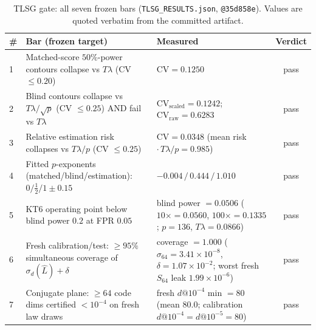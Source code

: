 \documentclass[10pt,onecolumn]{article}
\theoremstyle{plain}
\theoremstyle{definition}
\begin{document}
\begin{table}[t]
\centering
\caption{TLSG gate: all seven frozen bars (\texttt{TLSG\_RESULTS.json},
\texttt{@35d858e}). Values are quoted verbatim from the committed artifact.}
\label{tab:s-tlsg}
\small
\begin{tabular}{@{}p{}p{}p{}c@{}}
\toprule
\# & Bar (frozen target) & Measured & Verdict \\
\midrule
1 & Matched-score $50\%$-power contours collapse vs $T\lambda$ (CV $\le0.20$) &
 $\mathrm{CV}=0.1250$ & pass \\
2 & Blind contours collapse vs $T\lambda/\sqrt p$ (CV $\le0.25$) AND fail vs
 $T\lambda$ & $\mathrm{CV}_{\mathrm{scaled}}=0.1242$;\ $\mathrm{CV}_{\mathrm{raw}}
 =0.6283$ & pass \\
3 & Relative estimation risk collapses vs $T\lambda/p$ (CV $\le0.25$) &
 $\mathrm{CV}=0.0348$ (mean risk $\cdot\,T\lambda/p=0.985$) & pass \\
4 & Fitted $p$-exponents (matched/blind/estimation): $0/\tfrac12/1\pm0.15$ &
 $-0.004\,/\,0.444\,/\,1.010$ & pass \\
5 & KT6 operating point below blind power $0.2$ at FPR $0.05$ &
 blind power $=0.0506$ ($10\times{=}0.0560$, $100\times{=}0.1335$; $p{=}136$,
 $T\lambda{=}0.0866$) & pass \\
6 & Fresh calibration/test: $\ge95\%$ simultaneous coverage of $\sigma_d(\hat
 L)+\delta$ & coverage $=1.000$ ($\sigma_{64}{=}3.41\times10^{-8}$,
 $\delta{=}1.07\times10^{-2}$; worst fresh $S_{64}$ leak $1.99\times10^{-6}$) &
 pass \\
7 & Conjugate plane: $\ge64$ code dims certified $<10^{-4}$ on fresh law draws &
 fresh $d@10^{-4}$ min $=80$ (mean $80.0$; calibration $d@10^{-4}=d@10^{-5}=80$) &
 pass \\
\bottomrule
\end{tabular}
\end{table}
\end{document}
